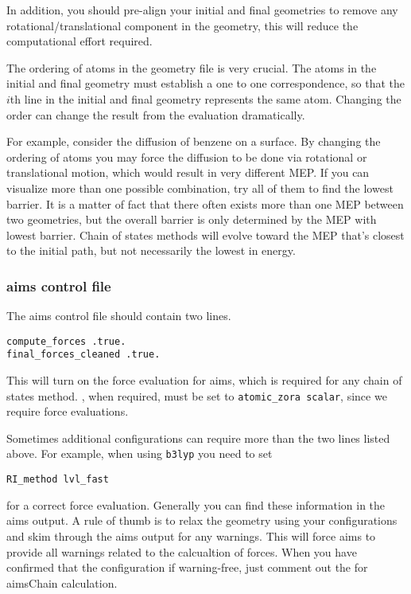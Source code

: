 In addition, you should pre-align your initial and final geometries to remove any rotational/translational component in the geometry, this will reduce the computational effort required. 

The ordering of atoms in the geometry file is very crucial. The atoms in the initial and final geometry must establish a one to one correspondence, so that the $i$th line in the initial and final geometry represents the same atom. Changing the order can change the result from the evaluation dramatically. 

For example, consider the diffusion of benzene on a surface. By changing the ordering of atoms you may force the diffusion to be done via rotational or translational motion, which would result in very different MEP. If you can visualize more than one possible combination, try all of them to find the lowest barrier. It is a matter of fact that there often exists more than one MEP between two geometries, but the overall barrier is only determined by the MEP with lowest barrier. Chain of states methods will evolve toward the MEP that's closest to the initial path, but not necessarily the lowest in energy. 

\subsubsection*{aims control file}
The aims control file should contain two lines.
\begin{verbatim}
compute_forces .true.
final_forces_cleaned .true.
\end{verbatim}
This will turn on the force evaluation for aims, which is required for any chain of states method. 
, when required, must be set to \texttt{atomic\_zora scalar}, since we require force evaluations. 

Sometimes additional configurations can require more than the two lines listed above. For example, when using \texttt{b3lyp} you need to set 
\begin{verbatim}
RI_method lvl_fast 
\end{verbatim}
for a correct force evaluation. Generally you can find these information in the aims output. A rule of thumb is to relax the geometry using your configurations and skim through the aims output for any warnings. This will force aims to provide all warnings related to the calcualtion of forces. When you have confirmed that the configuration if warning-free, just comment out the  for aimsChain calculation.

